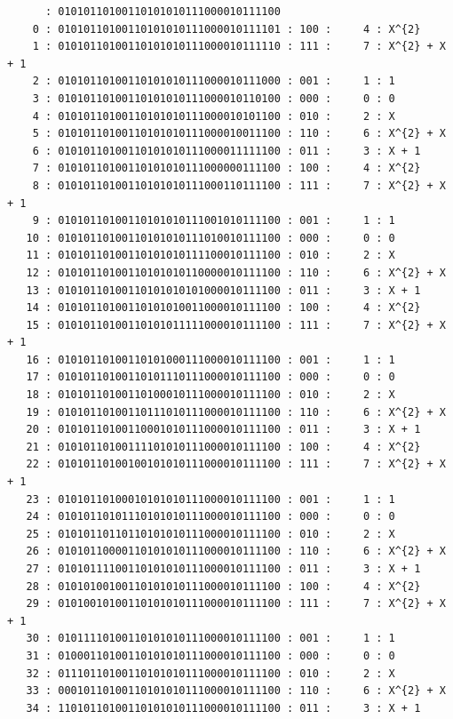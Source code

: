 \begin{verbatim}
      : 01010110100110101010111000010111100
    0 : 01010110100110101010111000010111101 : 100 :     4 : X^{2}
    1 : 01010110100110101010111000010111110 : 111 :     7 : X^{2} + X + 1
    2 : 01010110100110101010111000010111000 : 001 :     1 : 1
    3 : 01010110100110101010111000010110100 : 000 :     0 : 0
    4 : 01010110100110101010111000010101100 : 010 :     2 : X
    5 : 01010110100110101010111000010011100 : 110 :     6 : X^{2} + X
    6 : 01010110100110101010111000011111100 : 011 :     3 : X + 1
    7 : 01010110100110101010111000000111100 : 100 :     4 : X^{2}
    8 : 01010110100110101010111000110111100 : 111 :     7 : X^{2} + X + 1
    9 : 01010110100110101010111001010111100 : 001 :     1 : 1
   10 : 01010110100110101010111010010111100 : 000 :     0 : 0
   11 : 01010110100110101010111100010111100 : 010 :     2 : X
   12 : 01010110100110101010110000010111100 : 110 :     6 : X^{2} + X
   13 : 01010110100110101010101000010111100 : 011 :     3 : X + 1
   14 : 01010110100110101010011000010111100 : 100 :     4 : X^{2}
   15 : 01010110100110101011111000010111100 : 111 :     7 : X^{2} + X + 1
   16 : 01010110100110101000111000010111100 : 001 :     1 : 1
   17 : 01010110100110101110111000010111100 : 000 :     0 : 0
   18 : 01010110100110100010111000010111100 : 010 :     2 : X
   19 : 01010110100110111010111000010111100 : 110 :     6 : X^{2} + X
   20 : 01010110100110001010111000010111100 : 011 :     3 : X + 1
   21 : 01010110100111101010111000010111100 : 100 :     4 : X^{2}
   22 : 01010110100100101010111000010111100 : 111 :     7 : X^{2} + X + 1
   23 : 01010110100010101010111000010111100 : 001 :     1 : 1
   24 : 01010110101110101010111000010111100 : 000 :     0 : 0
   25 : 01010110110110101010111000010111100 : 010 :     2 : X
   26 : 01010110000110101010111000010111100 : 110 :     6 : X^{2} + X
   27 : 01010111100110101010111000010111100 : 011 :     3 : X + 1
   28 : 01010100100110101010111000010111100 : 100 :     4 : X^{2}
   29 : 01010010100110101010111000010111100 : 111 :     7 : X^{2} + X + 1
   30 : 01011110100110101010111000010111100 : 001 :     1 : 1
   31 : 01000110100110101010111000010111100 : 000 :     0 : 0
   32 : 01110110100110101010111000010111100 : 010 :     2 : X
   33 : 00010110100110101010111000010111100 : 110 :     6 : X^{2} + X
   34 : 11010110100110101010111000010111100 : 011 :     3 : X + 1
\end{verbatim}
